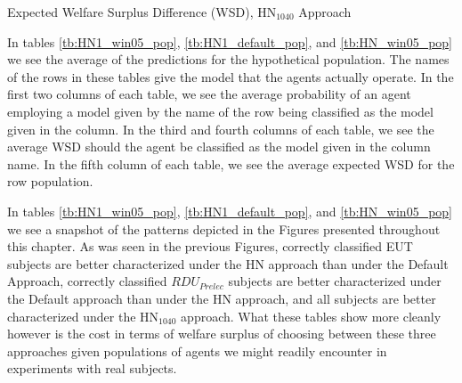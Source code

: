 \documentclass[../main.tex]{subfiles}
\begin{document}
{\begin{table}[h!] %
	\centering
	\caption{Expected Welfare Surplus Difference (WSD), $\text{HN}_{1040}$ Approach}
	\label{tb:HN_win05_pop}
	\begin{adjustbox}{}
	\end{adjustbox}
\end{table}
}

In tables \ref{tb:HN1_win05_pop}, \ref{tb:HN1_default_pop}, and \ref{tb:HN_win05_pop} we see the average of the predictions for the hypothetical population.
The names of the rows in these tables give the model that the agents actually operate.
In the first two columns of each table, we see the average probability of an agent employing a model given by the name of the row being classified as the model given in the column.
In the third and fourth columns of each table, we see the average WSD should the agent be classified as the model given in the column name.
In the fifth column of each table, we see the average expected WSD for the row population.

In tables \ref{tb:HN1_win05_pop}, \ref{tb:HN1_default_pop}, and \ref{tb:HN_win05_pop} we see a snapshot of the patterns depicted in the Figures presented throughout this chapter.
As was seen in the previous Figures, correctly classified EUT subjects are better characterized under the HN approach than under the Default Approach, correctly classified $\mathit{RDU_{Prelec}}$ subjects are better characterized under the Default approach than under the HN approach, and all subjects are better characterized under the $\text{HN}_{1040}$ approach.
What these tables show more cleanly however is the cost in terms of welfare surplus of choosing between these three approaches given populations of agents we might readily encounter in experiments with real subjects.
\end{document}
